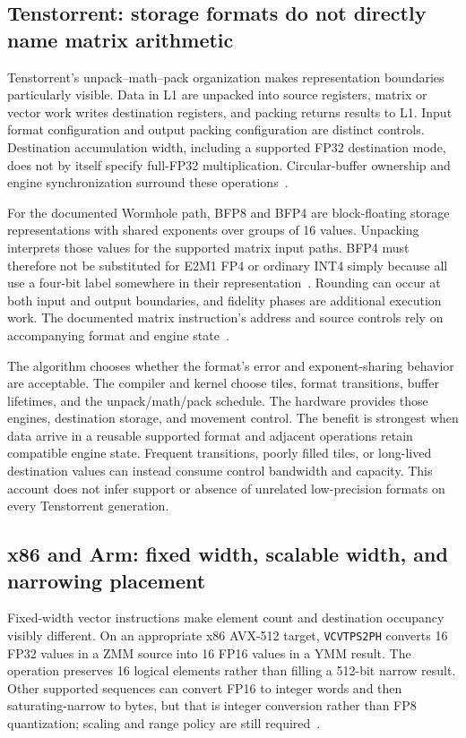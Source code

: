 \subsection{Tenstorrent: storage formats do not directly name matrix arithmetic}

Tenstorrent's unpack--math--pack organization makes representation boundaries particularly visible. Data in L1 are unpacked into source registers, matrix or vector work writes destination registers, and packing returns results to L1. Input format configuration and output packing configuration are distinct controls. Destination accumulation width, including a supported FP32 destination mode, does not by itself specify full-FP32 multiplication. Circular-buffer ownership and engine synchronization surround these operations~\citep{u003_tt_engines}.

For the documented Wormhole path, BFP8 and BFP4 are block-floating storage representations with shared exponents over groups of 16 values. Unpacking interprets those values for the supported matrix input paths. BFP4 must therefore not be substituted for E2M1 FP4 or ordinary INT4 simply because all use a four-bit label somewhere in their representation~\citep{u003_tt_unpack}. Rounding can occur at both input and output boundaries, and fidelity phases are additional execution work. The documented matrix instruction's address and source controls rely on accompanying format and engine state~\citep{u003_tt_matrix}.

The algorithm chooses whether the format's error and exponent-sharing behavior are acceptable. The compiler and kernel choose tiles, format transitions, buffer lifetimes, and the unpack/math/pack schedule. The hardware provides those engines, destination storage, and movement control. The benefit is strongest when data arrive in a reusable supported format and adjacent operations retain compatible engine state. Frequent transitions, poorly filled tiles, or long-lived destination values can instead consume control bandwidth and capacity. This account does not infer support or absence of unrelated low-precision formats on every Tenstorrent generation.

\subsection{x86 and Arm: fixed width, scalable width, and narrowing placement}

Fixed-width vector instructions make element count and destination occupancy visibly different. On an appropriate x86 AVX-512 target, \texttt{VCVTPS2PH} converts 16 FP32 values in a ZMM source into 16 FP16 values in a YMM result. The operation preserves 16 logical elements rather than filling a 512-bit narrow result. Other supported sequences can convert FP16 to integer words and then saturating-narrow to bytes, but that is integer conversion rather than FP8 quantization; scaling and range policy are still required~\citep{u003_intel_sdm}.

